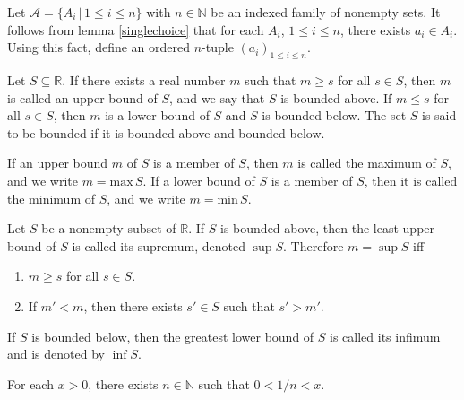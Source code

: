 \documentclass{article}
\begin{document}
\begin{IEEEproof}
	Let \(\mathscr{A}=\{A_i\,|\,1\leq i\leq n\}\) with \(n\in\mathbb{N}\) be an indexed family of nonempty sets. It follows from lemma \ref{singlechoice} that for each \(A_i\), \(1\leq i\leq n\), there exists \(a_i\in A_i\). Using this fact, define an ordered \(n\)-tuple \((a_i)_{1\leq i\leq n}\).
\end{IEEEproof}
\begin{definition}
	Let \(S\subseteq\mathbb{R}\). If there exists a real number \(m\) such that \(m\geq s\) for all \(s\in S\), then \(m\) is called an upper bound of \(S\), and we say that \(S\) is bounded above. If \(m\leq s\) for all \(s\in S\), then \(m\) is a lower bound of \(S\) and \(S\) is bounded below. The set \(S\) is said to be bounded if it is bounded above and bounded below.
\end{definition}
\begin{definition}
	If an upper bound \(m\) of \(S\) is a member of \(S\), then \(m\) is called the maximum of \(S\), and we write \(m=\text{max}\, S\). If a lower bound of \(S\) is a member of \(S\), then it is called the minimum of \(S\), and we write \(m=\text{min}\, S\).
\end{definition}
\begin{definition}
	Let \(S\) be a nonempty subset of \(\mathbb{R}\). If \(S\) is bounded above, then the least upper bound of \(S\) is called its supremum, denoted \(\sup S\). Therefore \(m=\sup S\) iff
	\begin{enumerate}
		\item \(m\geq s\) for all \(s\in S\).
		\item If \(m'<m\), then there exists \(s'\in S\) such that \(s'>m'\).
	\end{enumerate}
	If \(S\) is bounded below, then the greatest lower bound of \(S\) is called its infimum and is denoted by \(\inf S\).
\end{definition}
\begin{theorem}
	For each \(x>0\), there exists \(n\in\mathbb{N}\) such that \(0<1/n<x\).
\end{theorem}
\end{document}

